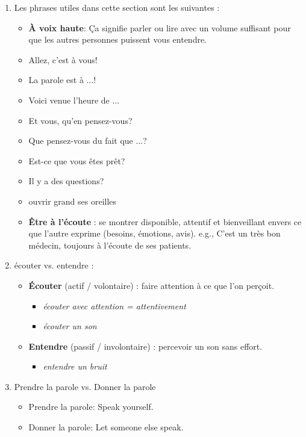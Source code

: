 \documentclass[math,code]{amznotes}
\theoremstyle{remark}
\begin{document}
\begin{enumerate}
    \item Les phrases utiles dans cette section sont les suivantes :
    \begin{itemize}
        \item \textbf{À voix haute}: Ça signifie parler ou lire avec un volume suffisant pour que les autres personnes puissent vous entendre.
        \item Allez, c'est à vous!
        \item La parole est à $\dots$!
        \item Voici venue l'heure de $\dots$
        \item Et vous, qu'en pensez-vous?
        \item Que pensez-vous du fait que $\dots$?
        \item Est-ce que vous êtes prêt?
        \item Il y a des questions?
        \item ouvrir grand ses oreilles
        \item \textbf{Être à l'écoute} : se montrer disponible, attentif et bienveillant envers ce que l'autre exprime (besoins, émotions, avis). e.g., C'est un très bon médecin, toujours à l'écoute de ses patients.
    \end{itemize}
    \item écouter vs. entendre :
    \begin{itemize}
        \item \textbf{Écouter} (actif / volontaire) : faire attention à ce que l'on perçoit.
        \begin{itemize}
            \item \textit{écouter avec attention = attentivement}
            \item \textit{écouter un son}
        \end{itemize}
        \item \textbf{Entendre} (passif / involontaire) : percevoir un son sans effort.
        \begin{itemize}
            \item \textit{entendre un bruit}
        \end{itemize}
    \end{itemize}
    \item Prendre la parole vs. Donner la parole
    \begin{itemize}
        \item Prendre la parole: Speak yourself.
        \item Donner la parole: Let someone else speak.
    \end{itemize}
\end{enumerate}
\end{document}
